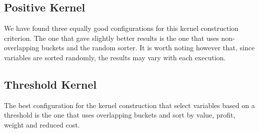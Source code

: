\subsection{Positive Kernel}
We have found three equally good configurations for this kernel construction criterion.
The one that gave slightly better results is the one that uses non-overlapping buckets and the random sorter.
It is worth noting however that, since variables are sorted randomly, the results may vary with each execution.

\subsection{Threshold Kernel}
The best configuration for the kernel construction that select variables based on a threshold is the one that uses
overlapping buckets and sort by value, profit, weight and reduced cost.





